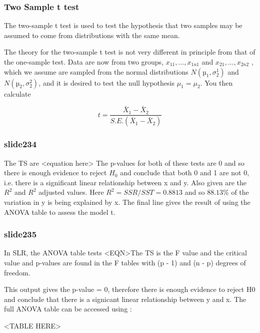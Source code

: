 \begin{itemize}
\subsubsection{Two Sample t test}

The two-sample t test is used to test the hypothesis that two samples may
be assumed to come from distributions with the same mean.

The theory for the two-sample t test is not very different in principle from
that of the one-sample test. Data are now from two groups, $x_{11}, . . . , x_{1n1}$
and $x_{21}, . . . , x_{2n2}$ , which we assume are sampled from the normal distributions
$N(µ_{1}, \sigma^{1}_{2} )$ and
$N(µ_{2}, \sigma^{2}_{2} )$, and it is desired to test the null hypothesis
$\mu_{1} = \mu_{2}$. You then calculate

\[
t = \frac{\bar{X}_{1}-\bar{X}_{2}}{S.E.(\bar{X}_{1}-\bar{X}_{2})}
\]




\subsubsection{slide234}
The TS are <equation here>  
The p-values for both of these tests are 0 and so there is enough evidence to reject $H_0$ and conclude that both 0 and 1 are not 0, i.e. there is a significant linear relationship between x and y. 
Also given are the $R^2$ and $R^2$ adjusted values. Here $R^2 = SSR/SST = 0.8813$ and so $88.13\%$ of the variation in y is being explained by x. 
The final line gives the result of using the ANOVA table to assess the model t.


\subsubsection{slide235}

In SLR, the ANOVA table tests <EQN>The TS is the F value and the critical value and p-values are found
in the F tables with (p - 1) and (n - p) degrees of freedom.

This output gives the p-value = 0, therefore there is enough evidence to reject H0 and conclude that there is a signicant linear relationship between y and x. The full ANOVA table can be accessed using :

<TABLE HERE>




\end{itemize}
